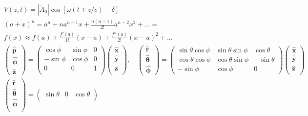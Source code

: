 \documentclass[10pt]{article}
\newcommand{\rhat}{\boldsymbol{\hat{\textbf{r}}}}
\newcommand{\xhat}{\boldsymbol{\hat{\textbf{x}}}}
\newcommand{\yhat}{\boldsymbol{\hat{\textbf{y}}}}
\newcommand{\zhat}{\boldsymbol{\hat{\textbf{z}}}}
\newcommand{\phihat}{\boldsymbol{\hat{\textbf{$\phi$}}}}
\newcommand{\thetahat}{\boldsymbol{\hat{\textbf{$\theta$}}}}
\newcommand{\rhohat}{\boldsymbol{\hat{\textbf{$\rho$}}}}
\newcommand{\lrb}[1]{\left[ #1 \right]}
\begin{document}
\begin{multicols}{2}
\begin{align*}
		& V(z,t) = |\widetilde{A}_0| \cos\lrb{\omega(t \mp z/c) -\delta} \tag*{Sinusoidal solutions to telegrapher's equation (L. 53)} \\
		& (a + x)^n = a^n + n a^{n-1} x + \frac{n (n-1)}{2!} a^{n-2} x^2 + ... =  \tag*{Binomial Expansion} \\
		& f(x) \approx f(a) + \frac{f'(a)}{1!}(x-a) + \frac{f''(a)}{2!}(x-a)^2 + ...  \tag*{Taylor Series} \\
 		&\begin{pmatrix}
			\rhohat \\
			\phihat \\
			\zhat
 		\end{pmatrix} =
 		\begin{pmatrix}
 			\cos \phi & \sin \phi & 0 \\
 			-\sin \phi & \cos \phi & 0 \\
 			0 & 0 & 1 \\
 		\end{pmatrix} 
 		\begin{pmatrix}
 			\xhat \\
 			\yhat \\
 			\zhat \\
 		\end{pmatrix}, \quad
 		\begin{pmatrix}
			\rhat \\
			\thetahat \\
			\phihat
 		\end{pmatrix} =
 		\begin{pmatrix}
			\sin \theta \cos \phi & \sin \theta \sin \phi & \cos \theta\\
			\cos \theta \cos \phi & \cos \theta \sin \phi & - \sin \theta \\
			-\sin \phi & \cos \phi & 0
 		\end{pmatrix} 
 		\begin{pmatrix}
 			\xhat \\
 			\yhat \\
 			\zhat \\
 		\end{pmatrix} \\
 		& \begin{pmatrix}
 			\rhat \\
 			\thetahat \\
 			\phihat \\
 		\end{pmatrix} = 
 		\begin{pmatrix}
 			\sin \theta & 0 & \cos \theta \\

\end{pmatrix}
\end{align*}
\end{multicols}
\end{document}
